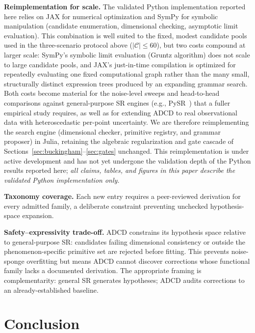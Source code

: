 \documentclass{article}
\begin{document}
\textbf{Reimplementation for scale.}
The validated Python implementation reported here relies on JAX for numerical
optimization and SymPy for symbolic manipulation (candidate enumeration,
dimensional checking, asymptotic limit evaluation). This combination is well
suited to the fixed, modest candidate pools used in the three-scenario protocol
above ($|\mathcal{C}|\le60$), but two costs compound at larger scale: SymPy's
symbolic limit evaluation (Gruntz algorithm) does not scale to large candidate
pools, and JAX's just-in-time compilation is optimized for repeatedly evaluating
one fixed computational graph rather than the many small, structurally distinct
expression trees produced by an expanding grammar search. Both costs become
material for the noise-level sweeps and head-to-head comparisons against
general-purpose SR engines (e.g., PySR~\cite{cranmer2020,cranmer2023}) that a
fuller empirical study requires, as well as for extending ADCD to real
observational data with heteroscedastic per-point uncertainty. We are therefore
reimplementing the search engine (dimensional checker, primitive registry, and
grammar proposer) in Julia, retaining the algebraic regularization and gate
cascade of Sections~\ref{sec:buckingham}--\ref{sec:gates} unchanged. This
reimplementation is under active development and has not yet undergone the
validation depth of the Python results reported here; \emph{all claims, tables,
and figures in this paper describe the validated Python implementation only.}

\textbf{Taxonomy coverage.}
Each new entry requires a peer-reviewed derivation for every admitted family,
a deliberate constraint preventing unchecked hypothesis-space expansion.

\textbf{Safety--expressivity trade-off.}
ADCD constrains its hypothesis space relative to general-purpose SR: candidates
failing dimensional consistency or outside the phenomenon-specific primitive set
are rejected before fitting.
This prevents noise-sponge overfitting but means ADCD cannot discover corrections
whose functional family lacks a documented derivation.
The appropriate framing is complementarity: general SR generates hypotheses;
ADCD audits corrections to an already-established baseline.

\section{Conclusion}
\end{document}
